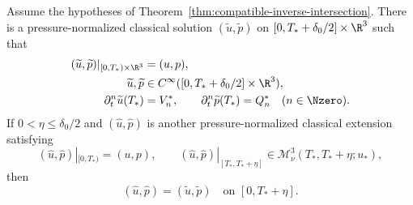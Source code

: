 \begin{theorem}
\label{thm:ier-same-history-restart}
Assume the hypotheses of
Theorem~\ref{thm:compatible-inverse-intersection}.
There is a pressure-normalized classical solution
\((\widetilde u,\widetilde p)\) on
\([0,T_*+\delta_0/2]\times\R^3\) such that
\begin{align}
 (\widetilde u,\widetilde p)|_{[0,T_*)\times\R^3}
 &=(u,p),
 \label{eq:ier-extension-identity}\\
 \widetilde u,\widetilde p
 &\in C^\infty([0,T_*+\delta_0/2]\times\R^3),
 \label{eq:ier-extension-smoothness}\\
 \partial_t^n\widetilde u(T_*)&=V_n^*,
 \qquad
 \partial_t^n\widetilde p(T_*)=Q_n^*
 \quad(n\in\Nzero).
 \label{eq:ier-extension-jet}
\end{align}
If \(0<\eta\le\delta_0/2\) and
\((\widehat u,\widehat p)\) is another pressure-normalized classical
extension satisfying
\begin{equation}
 (\widehat u,\widehat p)|_{[0,T_*)}=(u,p),
 \qquad
 (\widehat u,\widehat p)|_{[T_*,T_*+\eta]}
 \in\mathscr M_\nu^3(T_*,T_*+\eta;u_*),
 \label{eq:ier-same-history-uniqueness-class}
\end{equation}
then
\begin{equation}
 (\widehat u,\widehat p)=(\widetilde u,\widetilde p)
 \quad\text{on }[0,T_*+\eta].
 \label{eq:ier-same-history-uniqueness}
\end{equation}
\end{theorem}

